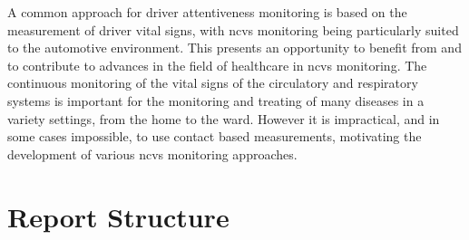 \documentclass[11pt, parskip=half*,twoside=false]{scrbook}
\begin{document}
A common approach for driver attentiveness monitoring is based on the measurement of driver vital signs, with \gls{ncvs} monitoring being particularly suited to the automotive environment. This presents an opportunity to benefit from and to contribute to advances in the field of healthcare in \gls{ncvs} monitoring. The continuous monitoring of the vital signs of the circulatory and respiratory systems is important for the monitoring and treating of many diseases in a variety settings, from the home to the ward. However it is impractical, and in some cases impossible, to use contact based measurements, motivating the development of various \gls{ncvs} monitoring approaches. 


\section{Report Structure} \label{sec:struct}
\end{document}
